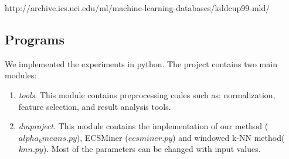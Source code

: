 \documentclass[runningheads]{llncs}
\begin{document}
	http://archive.ics.uci.edu/ml/machine-learning-databases/kddcup99-mld/
	
	\subsection{Programs}
	We implemented the experiments in python. The project contains two main modules:
	\begin{enumerate}
		\item \textit{tools}. This module contains preprocessing codes such as: normalization, feature selection, and result analysis tools.
		\item \textit{dmproject}. This module contains the implementation of our method ($alpha_kmeans.py$), ECSMiner ($ecsminer.py$) and windowed k-NN method($knn.py$). Most of the parameters can be changed with input values.
	\end{enumerate}
\end{document}
